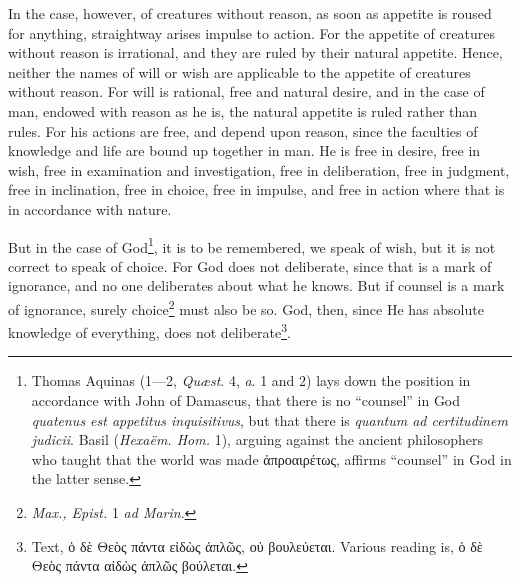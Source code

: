 In the case, however, of creatures without reason, as soon as appetite is roused for anything, straightway arises impulse to action. For the appetite of creatures without reason is irrational, and they are ruled by their natural appetite. Hence, neither the names of will or wish are applicable to the appetite of creatures without reason. For will is rational, free and natural desire, and in the case of man, endowed with reason as he is, the natural appetite is ruled rather than rules. For his actions are free, and depend upon reason, since the faculties of knowledge and life are bound up together in man. He is free in desire, free in wish, free in examination and investigation, free in deliberation, free in judgment, free in inclination, free in choice, free in impulse, and free in action where that is in accordance with nature.

But in the case of God\footnote{Thomas Aquinas (1—2, \emph{Quæst}. 4, \emph{a}. 1 and 2) lays down the position in accordance with John of Damascus, that there is no “counsel” in God \emph{quatenus est appetitus inquisitivus}, but that there is \emph{quantum ad certitudinem judicii}. Basil (\emph{Hexaëm. Hom. }1), arguing against the ancient philosophers who taught that the world was made \textgreek{ἀπροαιρέτως}, affirms “counsel” in God in the latter sense.}, it is to be remembered, we speak of wish, but it is not correct to speak of choice. For God does not deliberate, since that is a mark of ignorance, and no one deliberates about what he knows. But if counsel is a mark of ignorance, surely choice\footnote{\emph{Max., Epist.} 1 \emph{ad Marin}.} must also be so. God, then, since He has absolute knowledge of everything, does not deliberate\footnote{Text, \textgreek{ὁ δὲ Θεὸς πάντα εἰδὼς ἁπλῶς, οὐ βουλεύεται}. Various reading is, \textgreek{ὁ δὲ Θεὸς πάντα αἰδὼς ἁπλῶς βούλεται}.}.

